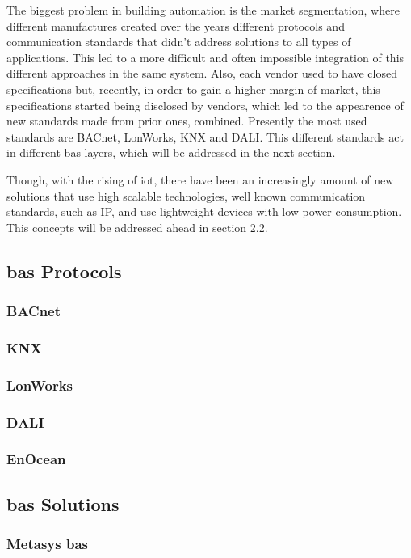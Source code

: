 The biggest problem in building automation is the market segmentation, where different manufactures created over the years different protocols and communication standards that didn't address solutions to all types of applications. This led to a more difficult and often impossible integration of this different approaches in the same system. Also, each vendor used to have closed specifications but, recently, in order to gain a higher margin of market, this specifications started being disclosed by vendors, which led to the appearence of new standards made from prior ones, combined. Presently the most used standards are BACnet, LonWorks, KNX and DALI. This different standards act in different \ac{bas} layers, which will be addressed in the next section. 

Though, with the rising of \ac{iot}, there have been an increasingly amount of new solutions that use high scalable technologies, well known communication standards, such as IP,  and use lightweight devices with low power consumption. This concepts will be addressed ahead in section 2.2.


\subsection{\ac{bas} Protocols}


\subsubsection{BACnet}
\subsubsection{KNX}
\subsubsection{LonWorks}
\subsubsection{DALI}
\subsubsection{EnOcean}
\subsection{\ac{bas} Solutions}
\subsubsection{Metasys \ac{bas}}
